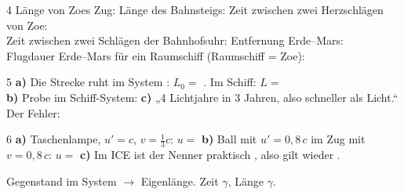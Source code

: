 \documentclass[11pt,a4paper]{article}
\begin{document}
\begin{aufgabe}[Wer misst das „Eigene“? \normalfont(B = Bea, Z = Zoe; prüfe auf der Website)]{4}
\lueckentext
Länge von Zoes Zug:  \quad Länge des Bahnsteigs:  \quad Zeit zwischen zwei Herzschlägen von Zoe: \\
Zeit zwischen zwei Schlägen der Bahnhofsuhr:  \quad Entfernung Erde–Mars: \\
Flugdauer Erde–Mars für ein Raumschiff (Raumschiff = Zoe): 
\end{aufgabe}

\begin{aufgabe}[Das Raumschiff, zweiter Teil \normalfont($v = 0{,}8\,c$, $\gamma = 1{,}67$, Erde: 4,0 Lj und 5,0 a, Borduhr: 3,0 a)]{5}
\lueckentext
\textbf{a)} Die Strecke ruht im System : $L_0 = $ . Im Schiff: $L = $ \\
\textbf{b)} Probe im Schiff-System: 
\textbf{c)} „4 Lichtjahre in 3 Jahren, also schneller als Licht.“ Der Fehler:
\end{aufgabe}

\begin{aufgabe}[Die neue Additionsregel: \quad $u = \dfrac{u' + v}{1 + u'\cdot v/c^2}$]{6}
\lueckentext
\textbf{a)} Taschenlampe, $u' = c$, $v = \frac{1}{3}c$: $u = $ 
\textbf{b)} Ball mit $u' = 0{,}8\,c$ im Zug mit $v = 0{,}8\,c$: $u = $ 
\textbf{c)} Im ICE ist der Nenner praktisch , also gilt wieder .
\end{aufgabe}

\begin{planbox}
\lueckentext
\textbf{} Gegenstand  im System $\to$ Eigenlänge. \quad \textbf{} Zeit  $\gamma$, Länge  $\gamma$.
\end{planbox}
\end{document}
